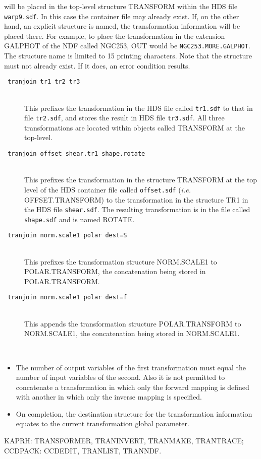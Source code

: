 \documentclass[twoside,11pt]{article}
\newcommand{\htmlref}[2]{#1}
\newcommand{\sstexamples}[1]{
   \goodbreak
   \item[Examples:] \mbox{} \\
   \vspace{-3.5ex}
   \begin{description}
      #1
   \end{description}
}
\newcommand{\sstexamplesubsection}[2]{\sloppy \item{\ssttt #1} \mbox{} \\ #2 }
\newcommand{\sstnotes}[1]{\pagebreak[3] \item[Notes:] \mbox{} \\[1.3ex] #1}
\newcommand{\sstdiytopic}[2]{\goodbreak \item[{\hspace{-0.35em}#1\hspace{-0.35em}:}] \mbox{} \\[1.3ex] #2}
\newenvironment{sstitemize}{%
  \vspace{-4.3ex}\begin{itemize}}{\end{itemize}}
\newcommand{\sstitemlist}[1]{
  \mbox{} \\
  \vspace{-3.5ex}
  \begin{sstitemize}
     #1
  \end{sstitemize}
}
\newcommand{\sstitem}{\item}
\newcommand{\ssttt}{\tt}
\renewcommand{\sstexamples}[1]{
      \htmlref{\item[Examples:]}{ap:example}
      \begin{description}
         #1
      \end{description}
   }
\renewcommand{\sstexamplesubsection}[2]{\item[{\ssttt #1}] \\ #2}
\renewcommand{\sstnotes}[1]{\item[Notes:]
      \begin{description}
         #1
      \end{description}
   }
\renewcommand{\sstdiytopic}[2]{\item[{#1}]
      \begin{description}
         #2
      \end{description}
   }
\newcommand{\sstitemlist}[1]{
      \begin{itemize}
         #1
      \end{itemize}
   }
\begin{document}
{{{         will be placed in the top-level structure TRANSFORM within the HDS
         file {\tt warp9.sdf}.  In this case the container file may already
         exist.  If, on the other hand, an explicit structure is named,
         the transformation information will be placed there.  For
         example, to place the transformation in the extension GALPHOT
         of the NDF called NGC253, OUT would be
         {\tt NGC253.MORE.GALPHOT}.  The structure name is limited to 15
         printing characters.  Note that the structure must not already
         exist.  If it does, an error condition results.
      }
   }
   \sstexamples{
      \sstexamplesubsection{
         tranjoin tr1 tr2 tr3
      }{
         This prefixes the transformation in the HDS file called
         {\tt tr1.sdf} to that in file {\tt tr2.sdf}, and stores the
         result in HDS file {\tt tr3.sdf}.  All three transformations
         are located within objects called TRANSFORM at the top-level.
      }
      \sstexamplesubsection{
         tranjoin offset shear.tr1 shape.rotate
      }{
         This prefixes the transformation in the structure TRANSFORM at
         the top level of the HDS container file called {\tt offset.sdf}
         ({\it i.e.} OFFSET.TRANSFORM) to the transformation in the structure
         TR1 in the HDS file {\tt shear.sdf}.  The resulting transformation is in
         the file called {\tt shape.sdf} and is named ROTATE.
      }
      \sstexamplesubsection{
         tranjoin norm.scale1 polar dest=S
      }{
         This prefixes the transformation structure NORM.SCALE1 to \linebreak
         POLAR.TRANSFORM, the concatenation being stored in
         POLAR.TRANSFORM.
      }
      \sstexamplesubsection{
         tranjoin norm.scale1 polar dest=f
      }{
         This appends the transformation structure POLAR.TRANSFORM to \linebreak
         NORM.SCALE1, the concatenation being stored in NORM.SCALE1.
      }
   }
   \sstnotes{
      \sstitemlist{

         \sstitem
         The number of output variables of the first transformation must
         equal the number of input variables of the second.  Also it is not
         permitted to concatenate a transformation in which only the
         forward mapping is defined with another in which only the inverse
         mapping is specified.

         \sstitem
         On completion, the destination structure for the
         transformation information equates to the current transformation
         global parameter.
      }
   }
   \sstdiytopic{
      Related Applications
   }{
      KAPRH: TRANSFORMER, TRANINVERT, TRANMAKE, TRANTRACE;
      CCDPACK: CCDEDIT, TRANLIST, TRANNDF.
   }
}
\end{document}
